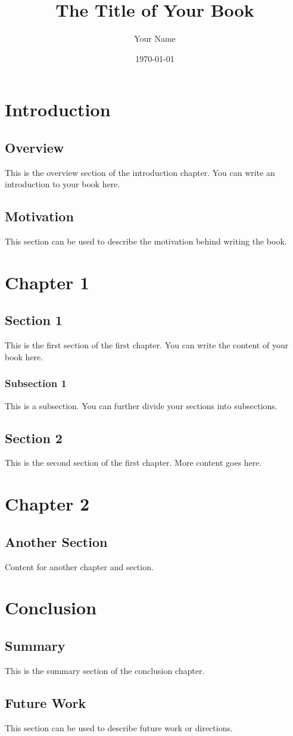 \documentclass[12pt]{book}
\title{The Title of Your Book}
\author{Your Name}
\date{\today}
\begin{document}
\maketitle

\tableofcontents

\listoffigures

\listoftables

\chapter{Introduction}
\section{Overview}
This is the overview section of the introduction chapter. You can write an introduction to your book here.

\section{Motivation}
This section can be used to describe the motivation behind writing the book.

\chapter{Chapter 1}
\section{Section 1}
This is the first section of the first chapter. You can write the content of your book here.

\subsection{Subsection 1}
This is a subsection. You can further divide your sections into subsections.

\section{Section 2}
This is the second section of the first chapter. More content goes here.

\chapter{Chapter 2}
\section{Another Section}
Content for another chapter and section.

\chapter{Conclusion}
\section{Summary}
This is the summary section of the conclusion chapter.

\section{Future Work}
This section can be used to describe future work or directions.

\printbibliography
\end{document}
